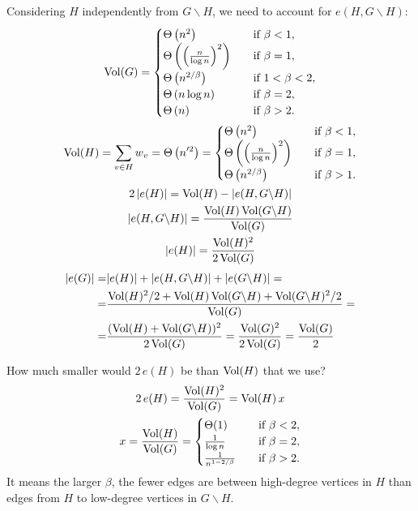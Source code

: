 Considering $H$ independently from $G\backslash H$,
we need to account for $e(H,G\backslash H)$:
\begin{gather}
    \operatorname*{Vol}(G)=\begin{cases}
        \Theta\left(n^2\right) & \quad \text{if } \beta<1,\\
        \Theta\left(\left(\frac{n}{\log n}\right)^2\right) & \quad \text{if } \beta=1,\\
        \Theta\left(n^{2/\beta}\right) & \quad \text{if } 1<\beta<2,\\
        \Theta\left(n\log n\right) & \quad \text{if } \beta=2,\\
        \Theta\left(n\right) & \quad \text{if } \beta>2.
    \end{cases}\\
    \operatorname*{Vol}(H)=\sum_{v\in H}{w_v}=\Theta\left(n'^2\right)=\begin{cases}
        \Theta\left(n^2\right) & \quad \text{if } \beta<1,\\
        \Theta\left(\left(\frac{n}{\log n}\right)^2\right) & \quad \text{if } \beta=1,\\
        \Theta\left(n^{2/\beta}\right) & \quad \text{if } \beta>1.
    \end{cases}\\
    2\,|e(H)|=\operatorname*{Vol}(H)-|e(H,G\backslash H)|\\
    |e(H,G\backslash H)|=\frac{\operatorname*{Vol}(H)\operatorname*{Vol}(G\backslash H)}{\operatorname*{Vol}(G)}\\
    |e(H)|=\frac{\operatorname*{Vol}(H)^2}{2\operatorname*{Vol}(G)}
\end{gather}
\begin{equation}
    \begin{split}
        |e(G)|=&|e(H)|+|e(H,G\backslash H)|+|e(G\backslash H)|=\\
        =&\frac{\operatorname*{Vol}(H)^2/2+\operatorname*{Vol}(H)\operatorname*{Vol}(G\backslash H)+\operatorname*{Vol}(G\backslash H)^2/2}{\operatorname*{Vol}(G)}=\\
        =&\frac{(\operatorname*{Vol}(H)+\operatorname*{Vol}(G\backslash H))^2}{2\operatorname*{Vol}(G)}
        =\frac{\operatorname*{Vol}(G)^2}{2\operatorname*{Vol}(G)}=\frac{\operatorname*{Vol}(G)}{2}
    \end{split}
\end{equation}

How much smaller would $2\,e(H)$ be than $\operatorname*{Vol}(H)$ that we use?
\begin{gather}
    2\,e(H)=\frac{\operatorname*{Vol}(H)^2}{\operatorname*{Vol}(G)}=\operatorname*{Vol}(H)\,x\\
    x=\frac{\operatorname*{Vol}(H)}{\operatorname*{Vol}(G)}=\begin{cases}
        \Theta(1) & \quad \text{if } \beta<2,\\
        \frac{1}{\log n} & \quad \text{if } \beta=2,\\
        \frac{1}{n^{1-2/\beta}} & \quad \text{if } \beta>2.
    \end{cases}
\end{gather}
It means the larger $\beta$, the fewer edges are between high-degree vertices in $H$
than edges from $H$ to low-degree vertices in $G\backslash H$.

